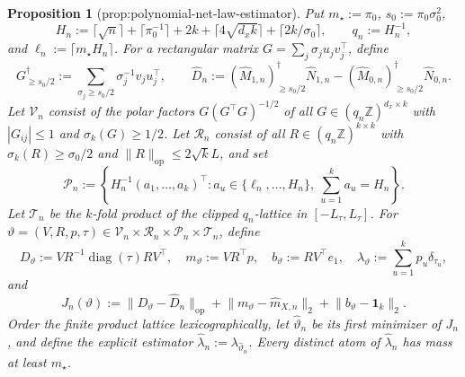 \documentclass{article}
\newtheorem{proposition}{Proposition}
\begin{document}
\begin{proposition}[prop:polynomial-net-law-estimator]\label{prop:polynomial-net-law-estimator}
Put \(m_\star:=\pi_0\), \(s_0:=\pi_0\sigma_0^2\),
\[
H_n:=\lceil\sqrt n\rceil+\lceil\pi_0^{-1}\rceil+2k
+\lceil4\sqrt{d_xk}\rceil+\lceil2k/\sigma_0\rceil,
\qquad q_n:=H_n^{-1},
\]
and \(\ell_n:=\lceil m_\star H_n\rceil\).  For a rectangular matrix \(G=\sum_j\sigma_j u_jv_j^\top\), define
\[
G^\dagger_{\ge s_0/2}:=\sum_{\sigma_j\ge s_0/2}\sigma_j^{-1}v_ju_j^\top,
\qquad
\widehat D_n:=(\widehat M_{1,n})^\dagger_{\ge s_0/2}\widehat N_{1,n}
-(\widehat M_{0,n})^\dagger_{\ge s_0/2}\widehat N_{0,n}.
\]
Let \(\mathcal V_n\) consist of the polar factors \(G(G^\top G)^{-1/2}\) of all \(G\in(q_n\mathbb Z)^{d_x\times k}\) with \(|G_{ij}|\le1\) and \(\sigma_k(G)\ge1/2\).  Let \(\mathcal R_n\) consist of all \(R\in(q_n\mathbb Z)^{k\times k}\) with \(\sigma_k(R)\ge\sigma_0/2\) and \(\lVert R\rVert_{\mathrm{op}}\le2\sqrt{k}L\), and set
\[
\mathcal P_n:=\left\{H_n^{-1}(a_1,\ldots,a_k)^\top:
a_u\in\{\ell_n,\ldots,H_n\},\ \sum_{u=1}^ka_u=H_n\right\}.
\]
Let \(\mathcal T_n\) be the \(k\)-fold product of the clipped \(q_n\)-lattice in \([-L_{\tau},L_{\tau}]\).  For \(\vartheta=(V,R,p,\tau)\in\mathcal V_n\times\mathcal R_n\times\mathcal P_n\times\mathcal T_n\), define
\[
D_\vartheta:=VR^{-1}\operatorname{diag}(\tau)RV^\top,
\quad m_\vartheta:=VR^\top p,
\quad b_\vartheta:=RV^\top e_1,
\quad \lambda_\vartheta:=\sum_{u=1}^kp_u\delta_{\tau_u},
\]
and
\[
J_n(\vartheta):=\lVert D_\vartheta-\widehat D_n\rVert_{\mathrm{op}}
+\lVert m_\vartheta-\widehat m_{X,n}\rVert_2
+\lVert b_\vartheta-\mathbf1_k\rVert_2.
\]
Order the finite product lattice lexicographically, let \(\widehat\vartheta_n\) be its first minimizer of \(J_n\), and define the explicit estimator \(\widehat\lambda_n:=\lambda_{\widehat\vartheta_n}\).  Every distinct atom of \(\widehat\lambda_n\) has mass at least \(m_\star\).


\end{proposition}
\end{document}
